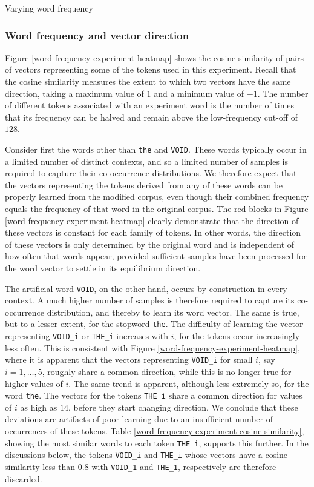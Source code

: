 \documentclass{article} %
\newcommand{\word}[1]{\texttt{#1}}
\begin{document}
\begin{section}{Varying word frequency}
\subsubsection{Word frequency and vector direction}\label{WFVE-direction}
Figure \ref{word-frequency-experiment-heatmap} shows the cosine
similarity of pairs of vectors representing some of the tokens used in
this experiment.  Recall that the cosine similarity measures the extent
to which two vectors have the same direction, taking a maximum value of
$1$ and a minimum value of $-1$.  The number of different tokens
associated with an experiment word is the number of times that its
frequency can be halved and remain above the low-frequency cut-off of
$128$.

Consider first the words other than \word{the} and \word{VOID}.  These
words typically occur in a limited number of distinct contexts, and
so a limited number of samples is required to capture their
co-occurrence distributions.  We therefore expect that the vectors
representing the tokens derived from any of these words can be properly
learned from the modified corpus, even though their combined frequency equals the frequency of that word in the original
corpus.  The red blocks in Figure \ref{word-frequency-experiment-heatmap}
clearly demonstrate that the direction of these vectors is constant for
each family of tokens.  In other words, the direction of these vectors
is only determined by the original word and is independent of how often
that words appear, provided sufficient samples have been processed for
the word vector to settle in its equilibrium direction.

The artificial word \word{VOID}, on the other hand, occurs by
construction in every context.  A much higher number of samples is
therefore required to capture its co-occurrence distribution, and
thereby to learn its word vector.  The same is true, but to a lesser
extent, for the stopword \word{the}.  The difficulty of learning the
vector representing \word{VOID\_i} or \word{THE\_i} increases with $i$,
for the tokens occur increasingly less often.  This is consistent with
Figure \ref{word-frequency-experiment-heatmap}, where it is apparent that
the vectors representing \word{VOID\_i} for small $i$, say $i = 1,
\dots, 5$, roughly share a common direction, while this is no longer
true for higher values of $i$.  The same trend is apparent, although
less extremely so, for the word \word{the}.  The vectors for the tokens
\word{THE\_i} share a common direction for values of $i$ as high as
$14$, before they start changing direction.  We conclude that these
deviations are artifacts of poor learning due to an insufficient number of occurrences of these tokens.
Table \ref{word-frequency-experiment-cosine-similarity}, showing the
most similar words to each token \word{THE\_i}, supports this further.  In the
discussions below, the tokens \word{VOID\_i} and
\word{THE\_i} whose vectors have a cosine similarity less than $0.8$
with \word{VOID\_1} and \word{THE\_1}, respectively are therefore
discarded.


\end{section}
\end{document}
